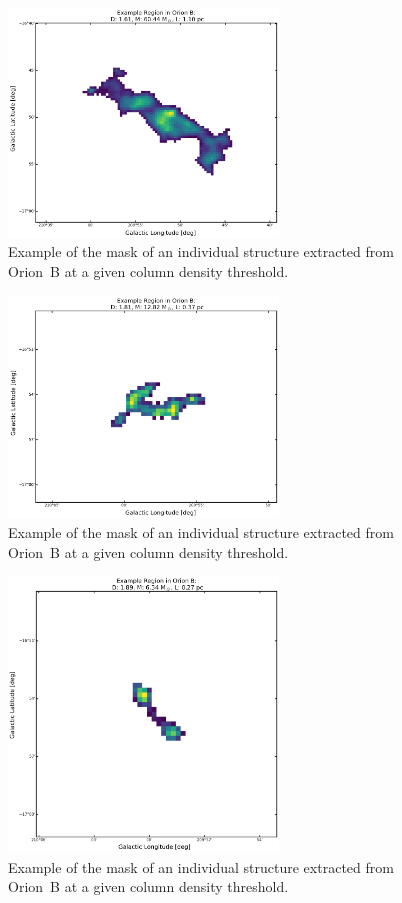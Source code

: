 \begin{figure}[h]
    \centering
    \includegraphics[width=0.64\textwidth]{figures/MSD_Gallery_Orion_B_2.png}
    \caption{Example of the mask of an individual structure extracted from Orion~B at a given column density threshold.}
    \label{fig:gallery_MSD_B_2}
\end{figure}

\begin{figure}[h]
    \centering
    \includegraphics[width=0.64\textwidth]{figures/MSD_Gallery_Orion_B_3.png}
    \caption{Example of the mask of an individual structure extracted from Orion~B at a given column density threshold.}
    \label{fig:gallery_MSD_B_3}
\end{figure}

\begin{figure}[h]
    \centering
    \includegraphics[width=0.64\textwidth]{figures/MSD_Gallery_Orion_B_4.png}
    \caption{Example of the mask of an individual structure extracted from Orion~B at a given column density threshold.}
    \label{fig:gallery_MSD_B_4}
\end{figure}

